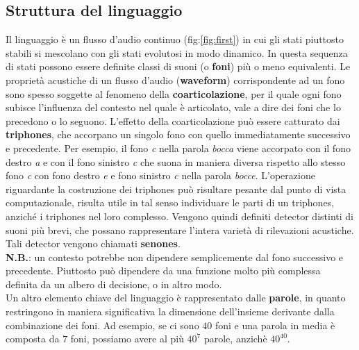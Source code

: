\documentclass[12pt]{article}
\begin{document}
    \subsection{Struttura del linguaggio}
    
    Il linguaggio è un flusso d'audio continuo (fig:\ref{fig:first}) in cui gli stati piuttosto stabili si mescolano con gli stati evolutosi in modo dinamico. In questa sequenza di stati possono essere definite classi di suoni (o \textbf{foni}) più o meno equivalenti. Le proprietà acustiche di un flusso d'audio (\textbf{waveform}) corrispondente ad un fono sono spesso soggette al fenomeno della \textbf{coarticolazione}, per il quale ogni fono subisce l'influenza del contesto nel quale è articolato, vale a dire dei foni che lo precedono o lo seguono.
    L'effetto della coarticolazione può essere catturato dai \textbf{triphones}, che accorpano un singolo fono con quello immediatamente successivo e precedente. Per esempio, il fono \textit{c}  nella parola \textit{bocca} viene accorpato con il fono destro \textit{a} e con il fono sinistro \textit{c} che suona in maniera diversa rispetto allo stesso fono \textit{c} con fono destro \textit{e} e fono sinistro \textit{c} nella parola \textit{bocce}.
    L'operazione riguardante la costruzione dei triphones può risultare pesante dal punto di vista computazionale, risulta utile in tal senso individuare le parti di un triphones, anziché i triphones nel loro complesso. 
    Vengono quindi definiti detector distinti di suoni più brevi, che possano rappresentare l'intera varietà di rilevazioni acustiche. 
    Tali detector vengono chiamati \textbf{senones}.\\
    \textbf{N.B.}: un contesto potrebbe non dipendere semplicemente dal fono successivo e precedente. Piuttosto può dipendere da una funzione molto più complessa definita da un albero di decisione, o in altro modo.\\
    Un altro elemento chiave del linguaggio è rappresentato dalle \textbf{parole}, in quanto restringono in maniera significativa la dimensione dell'insieme derivante dalla combinazione dei foni. Ad esempio, se ci sono $40$ foni e una parola in media è composta da $7$ foni, possiamo avere al più $40^7$ parole, anzichè $40^{40}$.  
        
\end{document}
